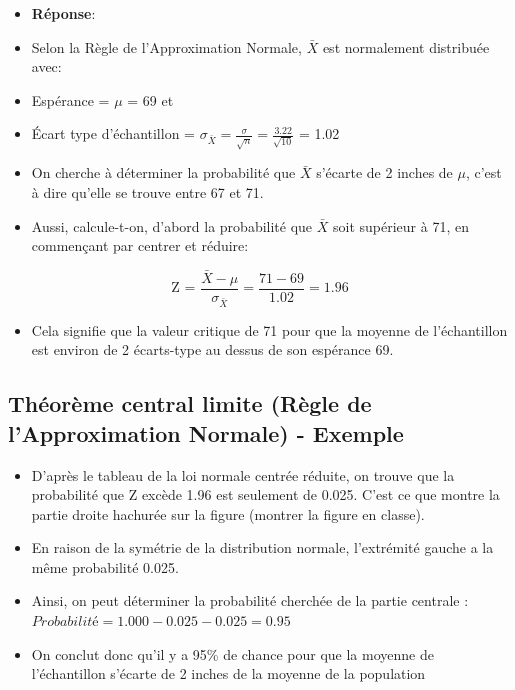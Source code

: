 \documentclass[
]{article}
\providecommand{\tightlist}{%
  \setlength{\itemsep}{0pt}\setlength{\parskip}{0pt}}
\begin{document}
\begin{itemize}
\item
  \textbf{Réponse}:
\item
  Selon la Règle de l'Approximation Normale, \(\bar{X}\) est normalement
  distribuée avec:
\item
  Espérance = \(\mu\) = 69 et
\item
  Écart type d'échantillon =
  \(\sigma_{\bar{X}} = \frac{\sigma}{\sqrt{n}} = \frac{3.22}{\sqrt{10}}\)
  = 1.02
\item
  On cherche à déterminer la probabilité que \(\bar{X}\) s'écarte de 2
  inches de \(\mu\), c'est à dire qu'elle se trouve entre 67 et 71.
\item
  Aussi, calcule-t-on, d'abord la probabilité que \(\bar{X}\) soit
  supérieur à 71, en commençant par centrer et réduire:
\end{itemize}

\[\text{Z = } \frac{\bar{X}-\mu}{\sigma_{\bar{X}}} = \frac{71 - 69}{1.02} = 1.96\]

\begin{itemize}
\tightlist
\item
  Cela signifie que la valeur critique de 71 pour que la moyenne de
  l'échantillon est environ de 2 écarts-type au dessus de son espérance
  69.
\end{itemize}

\hypertarget{thuxe9oruxe8me-central-limite-ruxe8gle-de-lapproximation-normale---exemple-1}{%
\subsection{Théorème central limite (Règle de l'Approximation Normale) -
Exemple}\label{thuxe9oruxe8me-central-limite-ruxe8gle-de-lapproximation-normale---exemple-1}}

\begin{itemize}
\tightlist
\item
  D'après le tableau de la loi normale centrée réduite, on trouve que la
  probabilité que Z excède 1.96 est seulement de 0.025. C'est ce que
  montre la partie droite hachurée sur la figure (montrer la figure en
  classe).
\item
  En raison de la symétrie de la distribution normale, l'extrémité
  gauche a la même probabilité 0.025.
\item
  Ainsi, on peut déterminer la probabilité cherchée de la partie
  centrale : \(Probabilité = 1.000 - 0.025 - 0.025 = 0.95\)
\item
  On conclut donc qu'il y a 95\% de chance pour que la moyenne de
  l'échantillon s'écarte de 2 inches de la moyenne de la population
\end{itemize}
\end{document}
